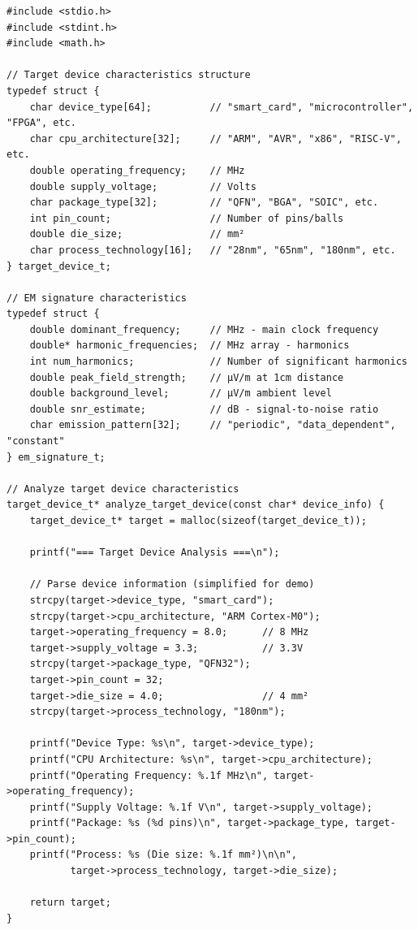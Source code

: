 \documentclass[11pt,a4paper]{article}
\theoremstyle{definition}
\begin{document}
\begin{lstlisting}[caption={Target Device Analysis and Characterization}]
#include <stdio.h>
#include <stdint.h>
#include <math.h>

// Target device characteristics structure
typedef struct {
    char device_type[64];          // "smart_card", "microcontroller", "FPGA", etc.
    char cpu_architecture[32];     // "ARM", "AVR", "x86", "RISC-V", etc.
    double operating_frequency;    // MHz
    double supply_voltage;         // Volts
    char package_type[32];         // "QFN", "BGA", "SOIC", etc.
    int pin_count;                 // Number of pins/balls
    double die_size;               // mm²
    char process_technology[16];   // "28nm", "65nm", "180nm", etc.
} target_device_t;

// EM signature characteristics
typedef struct {
    double dominant_frequency;     // MHz - main clock frequency
    double* harmonic_frequencies;  // MHz array - harmonics
    int num_harmonics;             // Number of significant harmonics
    double peak_field_strength;    // μV/m at 1cm distance
    double background_level;       // μV/m ambient level
    double snr_estimate;           // dB - signal-to-noise ratio
    char emission_pattern[32];     // "periodic", "data_dependent", "constant"
} em_signature_t;

// Analyze target device characteristics
target_device_t* analyze_target_device(const char* device_info) {
    target_device_t* target = malloc(sizeof(target_device_t));
    
    printf("=== Target Device Analysis ===\n");
    
    // Parse device information (simplified for demo)
    strcpy(target->device_type, "smart_card");
    strcpy(target->cpu_architecture, "ARM Cortex-M0");
    target->operating_frequency = 8.0;      // 8 MHz
    target->supply_voltage = 3.3;           // 3.3V
    strcpy(target->package_type, "QFN32");
    target->pin_count = 32;
    target->die_size = 4.0;                 // 4 mm²
    strcpy(target->process_technology, "180nm");
    
    printf("Device Type: %s\n", target->device_type);
    printf("CPU Architecture: %s\n", target->cpu_architecture);
    printf("Operating Frequency: %.1f MHz\n", target->operating_frequency);
    printf("Supply Voltage: %.1f V\n", target->supply_voltage);
    printf("Package: %s (%d pins)\n", target->package_type, target->pin_count);
    printf("Process: %s (Die size: %.1f mm²)\n\n", 
           target->process_technology, target->die_size);
    
    return target;
}
\end{lstlisting}
\end{document}

